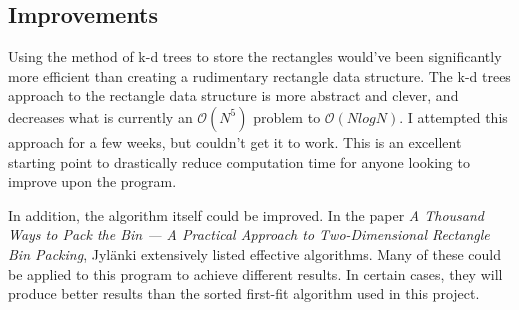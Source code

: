\documentclass[10pt,titlepage,letterpaper]{article}
\begin{document}
	\subsection{Improvements}
	Using the method of k-d trees to store the rectangles would've been significantly more efficient than creating a rudimentary rectangle data structure. The k-d trees approach to the rectangle data structure is more abstract and clever, and decreases what is currently an $\mathcal{O}(N^5)$ problem to $\mathcal{O}(NlogN)$. I attempted this approach for a few weeks, but couldn't get it to work. This is an excellent starting point to drastically reduce computation time for anyone looking to improve upon the program.\par
	In addition, the algorithm itself could be improved. In the paper \textit{A Thousand Ways to Pack the Bin --- A Practical Approach to Two-Dimensional Rectangle Bin Packing}\cite{thousand}, Jyl{\"a}nki extensively listed effective algorithms. Many of these could be applied to this program to achieve different results. In certain cases, they will produce better results than the sorted first-fit algorithm used in this project.

	
	
\end{document}
